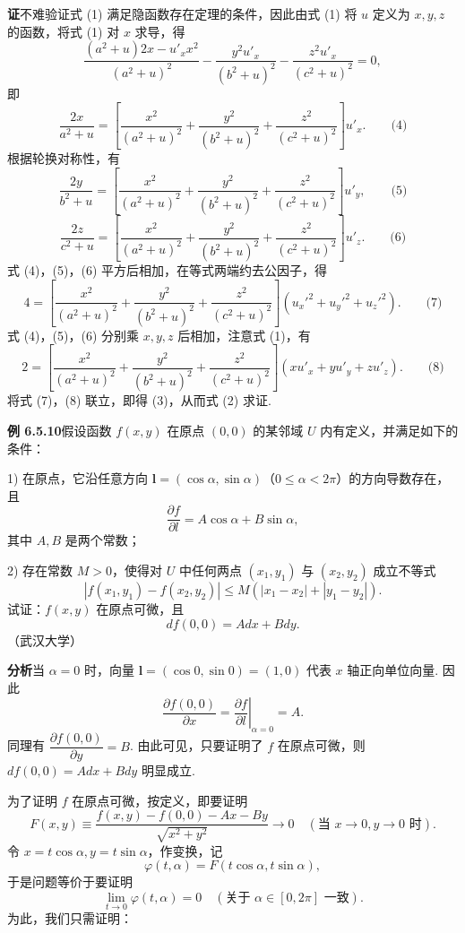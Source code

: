 \documentclass[UTF8, 12pt, fontset=fandol, oneside]{ctexart}
\begin{document}
\noindent\textbf{证}\quad 不难验证式 (1) 满足隐函数存在定理的条件，因此由式 (1) 将 $u$ 定义为 $x,y,z$ 的函数，将式 (1) 对 $x$ 求导，得
\[
  \frac{(a^2+u)2x-u'_x x^2}{(a^2+u)^2}
  -
  \frac{y^2u'_x}{(b^2+u)^2}
  -
  \frac{z^2u'_x}{(c^2+u)^2}=0,
\]
即
\[
  \frac{2x}{a^2+u}
  =
  \left[
  \frac{x^2}{(a^2+u)^2}
  +
  \frac{y^2}{(b^2+u)^2}
  +
  \frac{z^2}{(c^2+u)^2}
  \right]u'_x. \qquad\text{(4)}
\]
根据轮换对称性，有
\[
  \frac{2y}{b^2+u}
  =
  \left[
  \frac{x^2}{(a^2+u)^2}
  +
  \frac{y^2}{(b^2+u)^2}
  +
  \frac{z^2}{(c^2+u)^2}
  \right]u'_y, \qquad\text{(5)}
\]
\[
  \frac{2z}{c^2+u}
  =
  \left[
  \frac{x^2}{(a^2+u)^2}
  +
  \frac{y^2}{(b^2+u)^2}
  +
  \frac{z^2}{(c^2+u)^2}
  \right]u'_z. \qquad\text{(6)}
\]
式 (4)，(5)，(6) 平方后相加，在等式两端约去公因子，得
\[
  4=
  \left[
  \frac{x^2}{(a^2+u)^2}
  +
  \frac{y^2}{(b^2+u)^2}
  +
  \frac{z^2}{(c^2+u)^2}
  \right](u_x'^2+u_y'^2+u_z'^2). \qquad\text{(7)}
\]
式 (4)，(5)，(6) 分别乘 $x,y,z$ 后相加，注意式 (1)，有
\[
  2=
  \left[
  \frac{x^2}{(a^2+u)^2}
  +
  \frac{y^2}{(b^2+u)^2}
  +
  \frac{z^2}{(c^2+u)^2}
  \right](xu'_x+yu'_y+zu'_z). \qquad\text{(8)}
\]
将式 (7)，(8) 联立，即得 (3)，从而式 (2) 求证.

\noindent\textbf{例 6.5.10}\quad 假设函数 $f(x,y)$ 在原点 $(0,0)$ 的某邻域 $U$ 内有定义，并满足如下的条件：

1) 在原点，它沿任意方向
$\mathbf l=(\cos\alpha,\sin\alpha)$（$0\le\alpha<2\pi$）的方向导数存在，且
\[
  \frac{\partial f}{\partial l}=A\cos\alpha+B\sin\alpha,
\]
其中 $A,B$ 是两个常数；

2) 存在常数 $M>0$，使得对 $U$ 中任何两点 $(x_1,y_1)$ 与 $(x_2,y_2)$ 成立不等式
\[
  |f(x_1,y_1)-f(x_2,y_2)|\le
  M(|x_1-x_2|+|y_1-y_2|).
\]
试证：$f(x,y)$ 在原点可微，且
\[
  df(0,0)=Adx+Bdy.
\]
（武汉大学）

\noindent\textbf{分析}\quad 当 $\alpha=0$ 时，向量
$\mathbf l=(\cos0,\sin0)=(1,0)$ 代表 $x$ 轴正向单位向量. 因此
\[
  \frac{\partial f(0,0)}{\partial x}
  =
  \left.\frac{\partial f}{\partial l}\right|_{\alpha=0}=A.
\]
同理有 $\dfrac{\partial f(0,0)}{\partial y}=B$. 由此可见，只要证明了 $f$ 在原点可微，则
$df(0,0)=Adx+Bdy$ 明显成立.

为了证明 $f$ 在原点可微，按定义，即要证明
\[
  F(x,y)\equiv
  \frac{f(x,y)-f(0,0)-Ax-By}{\sqrt{x^2+y^2}}
  \to0\quad(\text{当 }x\to0,y\to0\text{ 时}).
\]
令 $x=t\cos\alpha,y=t\sin\alpha$，作变换，记
\[
  \varphi(t,\alpha)=F(t\cos\alpha,t\sin\alpha),
\]
于是问题等价于要证明
\[
  \lim_{t\to0}\varphi(t,\alpha)=0
  \quad(\text{关于 }\alpha\in[0,2\pi]\text{ 一致}).
\]
为此，我们只需证明：
\end{document}
